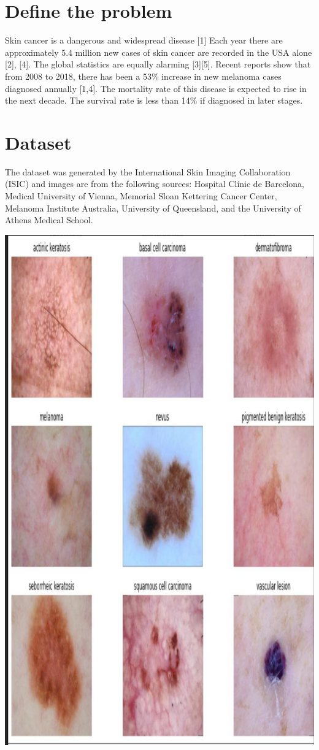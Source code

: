 \documentclass{article}
\begin{document}
	\section*{Define the problem} 
	Skin cancer is a dangerous and widespread disease [1] Each year there are approximately 5.4 million new cases of skin cancer are recorded in the USA alone [2], [4]. The global statistics are equally alarming [3][5]. Recent reports show that from 2008 to 2018, there has been a 53\% increase in new melanoma cases diagnosed annually [1,4]. The mortality rate of this disease is expected to rise in the next decade. The survival rate is less than 14\% if diagnosed in later stages.\\
	\section*{Dataset}
	The dataset was generated by the International Skin Imaging Collaboration (ISIC) and images are from the following sources: Hospital Clínic de Barcelona, Medical University of Vienna, Memorial Sloan Kettering Cancer Center, Melanoma Institute Australia, University of Queensland, and the University of Athens Medical School.
	\\
	\begin{center}
	\includegraphics[scale=0.2]{./Fig/sample_photo.jpg}
	\end{center}
\end{document}
